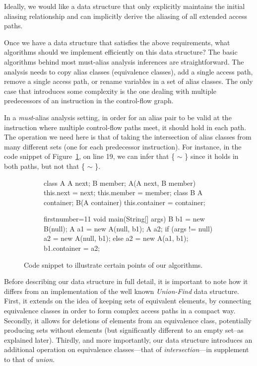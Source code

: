 Ideally, we would like a data structure that only explicitly maintains the initial aliasing relationship and can implicitly derive the aliasing of all extended access paths.


Once we have a data structure that satisfies the above requirements, what algorithms should we implement efficiently on this data structure? The basic algorithms behind most must-alias analysis inferences are straightforward. The analysis needs to copy alias classes (equivalence classes), add a single access path, remove a single access path, or rename variables in a set of alias classes. The only case that introduces some complexity is the one dealing with multiple predecessors of an instruction in the control-flow graph.

In a \emph{must}-alias analysis setting, in order for an alias pair to be valid at the instruction where multiple control-flow paths meet, it should hold in each path. The operation we need here is that of taking the intersection of alias classes from many different sets (one for each predecessor instruction). For instance, in the code snippet of Figure~\ref{fig:must-data:snippet}, on line 19, we can infer that \{ $\sim$ \} since it holds in both paths, but not that \{ $\sim$ \}.

\begin{figure}[htb!p]
\begin{subfigure}{.45\textwidth}
\begin{javacode}
class A { 
    A next;
    B member;
    A(A next, B member) {
        this.next = next;
        this.member = member; } }
class B {
    A container;
    B(A container) {
        this.container = container; } }
\end{javacode}
\end{subfigure}%
\hfill
\begin{subfigure}{.45\textwidth}
\begin{javacode*}{firstnumber=11}
void main(String[] args) {
    B b1 = new B(null);
    A a1 = new A(null, b1);
    A a2;
    if (args != null) 
        a2 = new A(null, b1);
    else
        a2 = new A(a1, b1);
    b1.container = a2;
}
\end{javacode*}
\end{subfigure}
\caption{Code snippet to illustrate certain points of our algorithms.}
\label{fig:must-data:snippet}
\end{figure}


Before describing our data structure in full detail, it is important to note how it differs from an implementation of the well known \emph{Union-Find} data structure. First, it extends on the idea of keeping sets of equivalent elements, by connecting equivalence classes in order to form complex access paths in a compact way. Secondly, it allows for deletions of elements from an equivalence class, potentially producing sets without elements (but significantly different to an empty set--as explained later). Thirdly, and more importantly, our data structure introduces an additional operation on equivalence classes---that of \emph{intersection}---in supplement to that of \emph{union}.

